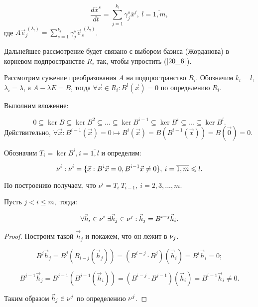 \begin{equation}\label{20_6}
	\frac{d\overline{x}^s}{dt} = \sum\limits_{j = 1}^{k_l}\gamma_j^s \overline{x}^j, \: l = \overline{1, m},
\end{equation}
где $A \vec{e}^{\: (\lambda_l)}_j = \sum\limits_{s=1}^{k_l}\gamma_j^s \vec{e}^{\: (\lambda_l)}_s$.

Дальнейшее рассмотрение будет связано с выбором базиса (Жорданова) в корневом подпространстве $R_i$ так, чтобы  упростить ($\ref{20_6}$).

Рассмотрим сужение преобразования $A$ на подпространство $R_i$. Обозначим $k_l = l$, $\lambda_i = \overline{\lambda}$, а $A - \overline{\lambda} E = B$, тогда $\forall \vec{x}\in R_i: B^l (\vec{x}) = 0$ по определению $R_i$.

Выполним вложение:

\[0\subseteq \ker B \subseteq \ker B^2 \subseteq ... \subseteq \ker B^{i - 1} \subseteq \ker B^i \subseteq ... \subseteq \ker B^l.\]
Действительно, $\forall \vec{x}: B^{i-1}(\vec{x}) = 0 \mapsto B^i(\vec{x}) = B(B^{i-1}(\vec{x})) = B(\vec{0}) = 0.$

Обозначим $T_i = \ker B^i, i = \overline{1, l}$ и определим:

\[\nu^i: \nu^i= \{\vec{x}: B^i \vec{x} = 0, B^{i-1}\vec{x} \neq 0 \}, \: i = \overline{1, m} \leqslant l.\]

По построению получаем, что $\nu^i = T_i \ T_{i-1}, \: i = 2, 3,..., m.$

\begin{theorem}\label{theor-20_1}
	Пусть $j < i \leqslant m,$ тогда:
	
	\begin{equation}\label{20_7}
		\forall \vec{h}_i \in \nu^i \; \exists \vec{h}_j \in  \nu^j: \vec{h}_j = B^{i - j} \vec{h}_i.
	\end{equation}
	\begin{proof}
		
		Построим такой $\vec{h}_j$ и покажем, что он лежит в $\nu_j$.
		
		\[B^j\vec{h}_j = B^j (B_{i-j} (\vec{h}_j)) = (B^{i - j} \cdot B^j)(\vec{h}_i) = B^i \vec{h}_i = 0; \]
		
		\[B^{j- 1} \vec{h}_j = B^{j - 1}(B^{j - 1} (\vec{h}_i)) = (B^{i - j} \cdot B^{j-1})(\vec{h}_i) = B^{i-1} \vec{h}_i \neq 0.\]
		
		Таким образом $\vec{h}_j \in \nu^j$ по определению $\nu^j$.
	\end{proof}
\end{theorem}

